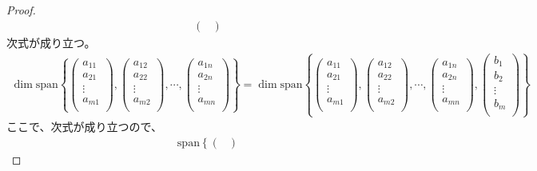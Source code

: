 \documentclass[dvipdfmx]{jsarticle}
\begin{document}
\begin{proof}
\begin{align*}
\begin{pmatrix}
\end{pmatrix}
\end{align*}
次式が成り立つ。
\begin{align*}
\dim{{\mathrm{span} }\left\{ \begin{pmatrix}
a_{11} \\
a_{21} \\
 \vdots \\
a_{m1} \\
\end{pmatrix},\begin{pmatrix}
a_{12} \\
a_{22} \\
 \vdots \\
a_{m2} \\
\end{pmatrix},\cdots,\begin{pmatrix}
a_{1n} \\
a_{2n} \\
 \vdots \\
a_{mn} \\
\end{pmatrix} \right\}} = \dim{{\mathrm{span} }\left\{ \begin{pmatrix}
a_{11} \\
a_{21} \\
 \vdots \\
a_{m1} \\
\end{pmatrix},\begin{pmatrix}
a_{12} \\
a_{22} \\
 \vdots \\
a_{m2} \\
\end{pmatrix},\cdots,\begin{pmatrix}
a_{1n} \\
a_{2n} \\
 \vdots \\
a_{mn} \\
\end{pmatrix},\begin{pmatrix}
b_{1} \\
b_{2} \\
 \vdots \\
b_{m} \\
\end{pmatrix} \right\}}
\end{align*}
ここで、次式が成り立つので、
\begin{align*}
{\mathrm{span} }\left\{ \begin{pmatrix}

\end{pmatrix}
\end{align*}
\end{proof}
\end{document}
